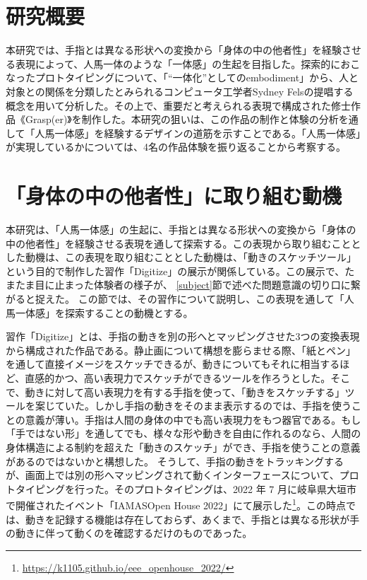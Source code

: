 \section{研究概要}
本研究では、手指とは異なる形状への変換から「身体の中の他者性」を経験させる表現によって、人馬一体のような「一体感」の生起を目指した。探索的におこなったプロトタイピングについて、「``一体化''としてのembodiment」から、人と対象との関係を分類したとみられるコンピュータ工学者Sydney Felsの提唱する概念を用いて分析した。その上で、重要だと考えられる表現で構成された修士作品《Grasp(er)》を制作した。本研究の狙いは、この作品の制作と体験の分析を通して「人馬一体感」を経験するデザインの道筋を示すことである。「人馬一体感」が実現しているかについては、4名の作品体験を振り返ることから考察する。

\section{「身体の中の他者性」に取り組む動機}
\label{prototyping_concept_making}
本研究は、「人馬一体感」の生起に、手指とは異なる形状への変換から「身体の中の他者性」を経験させる表現を通して探索する。この表現から取り組むこととした動機は、この表現を取り組むこととした動機は、「動きのスケッチツール」という目的で制作した習作「Digitize」の展示が関係している。この展示で、たまたま目に止まった体験者の様子が、 \ref{subject}節で述べた問題意識の切り口に繋がると捉えた。
この節では、その習作について説明し、この表現を通して「人馬一体感」を探索することの動機とする。

習作「Digitize」とは、手指の動きを別の形へとマッピングさせた3つの変換表現から構成された作品である。静止画について構想を膨らませる際、「紙とペン」を通して直接イメージをスケッチできるが、動きについてもそれに相当するほど、直感的かつ、高い表現力でスケッチができるツールを作ろうとした。そこで、動きに対して高い表現力を有する手指を使って、「動きをスケッチする」ツールを案じていた。しかし手指の動きをそのまま表示するのでは、手指を使うことの意義が薄い。手指は人間の身体の中でも高い表現力をもつ器官である。もし「手ではない形」を通してでも、様々な形や動きを自由に作れるのなら、人間の身体構造による制約を超えた「動きのスケッチ」ができ、手指を使うことの意義があるのではないかと構想した。
そうして、手指の動きをトラッキングするが、画面上では別の形へマッピングされて動くインターフェースについて、プロトタイピングを行った。そのプロトタイピングは、2022 年 7 月に岐阜県大垣市で開催されたイベント「IAMASOpen House 2022」にて展示した\footnote{\url{https://k1105.github.io/eee_openhouse_2022/}}。この時点では、動きを記録する機能は存在しておらず、あくまで、手指とは異なる形状が手の動きに伴って動くのを確認するだけのものであった。


